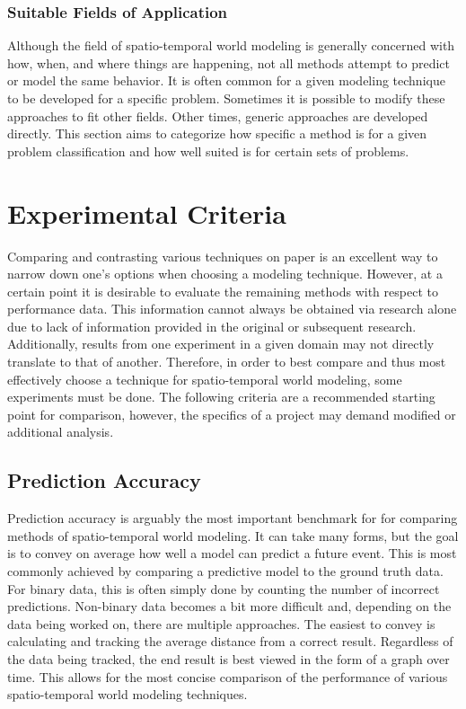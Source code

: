   \subsubsection{ Suitable Fields of Application }
  Although the field of spatio-temporal world modeling is generally concerned
  with how, when, and where things are happening, not all methods attempt to
  predict or model the same behavior. It is often common for a given modeling
  technique to be developed for a specific problem. Sometimes it is possible to
  modify these approaches to fit other fields. Other times, generic
  approaches are developed directly. This section aims to categorize how specific
  a method is for a given problem classification and how well suited is for certain
  sets of problems.


  \section{ Experimental Criteria }

  Comparing and contrasting various techniques on paper is an excellent way
  to narrow down one's options when choosing a modeling technique. However, at
  a certain point it is desirable to evaluate the remaining methods with
  respect to performance data. This information cannot always be obtained via
  research alone due to lack of information provided in the original or
  subsequent research. Additionally, results from  one experiment in a given domain
  may not directly translate to that of another. Therefore, in order to best
  compare and thus most effectively choose a technique for spatio-temporal
  world modeling, some experiments must be done. The following criteria are
  a recommended starting point for comparison, however, the specifics of a
  project may demand modified or additional analysis.

  \subsection{ Prediction Accuracy }
  Prediction accuracy is arguably the most important benchmark for for comparing methods
  of spatio-temporal world modeling. It can take many forms, but the goal is
  to convey on average how well a model can predict a future event. This is
  most commonly achieved by comparing a predictive model to the ground truth
  data. For binary data, this is often simply done by counting the number of
  incorrect predictions. Non-binary data becomes a bit more difficult and, depending
  on the data being worked on, there are multiple approaches. The easiest
  to convey is calculating and tracking the average distance from a correct
  result. Regardless of the data being tracked, the end result is best viewed
  in the form of a graph over time. This allows for the most concise comparison
  of the performance of various spatio-temporal world modeling techniques.

